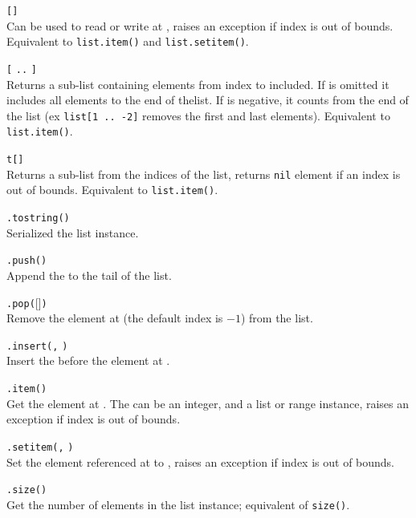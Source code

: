\hangpar  {}\texttt{[}\texttt{]}\\
Can be used to read or write at , raises an exception if index is out of bounds. Equivalent to \texttt{list.item()} and \texttt{list.setitem()}.

\hangpar  {}\texttt{[} \texttt{..} \texttt{]}\\
Returns a sub-list containing elements from index  to  included. If  is omitted it includes all elements to the end of thelist. If  is negative, it counts from the end of the list (ex \texttt{list[1 .. -2]} removes the first and last elements). Equivalent to \texttt{list.item()}.

\hangpar  {}\texttt{t[}\texttt{]}\\
Returns a sub-list from the indices of the list, returns \texttt{nil} element if an index is out of bounds. Equivalent to \texttt{list.item()}.

\hangpar {}\texttt{.tostring()}\\
Serialized the list instance.

\hangpar {}\texttt{.push(}\texttt{)}\\
Append the  to the tail of the list.

\hangpar {}\texttt{.pop(}[]\texttt{)}\\
Remove the element at  (the default index is $-1$) from the list.

\hangpar {}\texttt{.insert(}\texttt{,} \texttt{)}\\
Insert the  before the element at .

\hangpar {}\texttt{.item(}\texttt{)}\\
Get the element at . The  can be an \textsf{integer}, and a \textsf{list} or \textsf{range} instance, raises an exception if index is out of bounds.

\hangpar {}\texttt{.setitem(}\texttt{,} \texttt{)}\\
Set the element referenced at  to , raises an exception if index is out of bounds.

\hangpar {}\texttt{.size()}\\
Get the number of elements in the list instance; equivalent of \texttt{size(}\texttt{)}.

